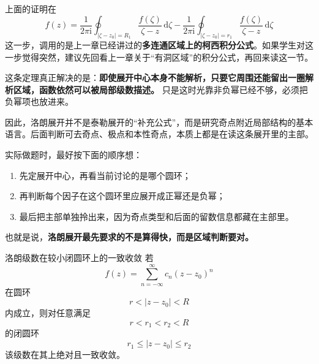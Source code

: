 \begin{tishi}[这里用了上一章的哪一个结论]
上面的证明在
\[
    f(z)=\frac{1}{2\pi\mathrm{i}}
    \oint_{|\zeta-z_0|=R_1}\frac{f(\zeta)}{\zeta-z}\,\mathrm{d}\zeta
    -
    \frac{1}{2\pi\mathrm{i}}
    \oint_{|\zeta-z_0|=r_1}\frac{f(\zeta)}{\zeta-z}\,\mathrm{d}\zeta
\]
这一步，调用的是上一章已经讲过的\textbf{多连通区域上的柯西积分公式}。如果学生对这一步觉得突然，建议先回看上一章关于``有洞区域''的积分公式，再回来读这一节。
\end{tishi}

\begin{tishi}[洛朗展开定理到底解决了什么问题]
这条定理真正解决的是：\textbf{即使展开中心本身不能解析，只要它周围还能留出一圈解析区域，函数依然可以被局部级数描述。} 只是这时光靠非负幂已经不够，必须把负幂项也放进来。

因此，洛朗展开并不是泰勒展开的``补充公式''，而是研究奇点附近局部结构的基本语言。后面判断可去奇点、极点和本性奇点，本质上都是在读这条展开里的主部。
\end{tishi}

\begin{tishi}[做题时怎么使用洛朗展开定理]
实际做题时，最好按下面的顺序想：
\begin{enumerate}
    \item 先定展开中心，再看当前讨论的是哪个圆环；
    \item 再判断每个因子在这个圆环里应展开成正幂还是负幂；
    \item 最后把主部单独拎出来，因为奇点类型和后面的留数信息都藏在主部里。
\end{enumerate}
也就是说，\textbf{洛朗展开最先要求的不是算得快，而是区域判断要对。}
\end{tishi}

\begin{yinli}{洛朗级数在较小闭圆环上的一致收敛}{}
若
\[
    f(z)=\sum_{n=-\infty}^{\infty} c_n (z-z_0)^n
\]
在圆环
\[
    r<|z-z_0|<R
\]
内成立，则对任意满足
\[
    r<r_1<r_2<R
\]
的闭圆环
\[
    r_1\le |z-z_0|\le r_2
\]
该级数在其上绝对且一致收敛。
\end{yinli}


